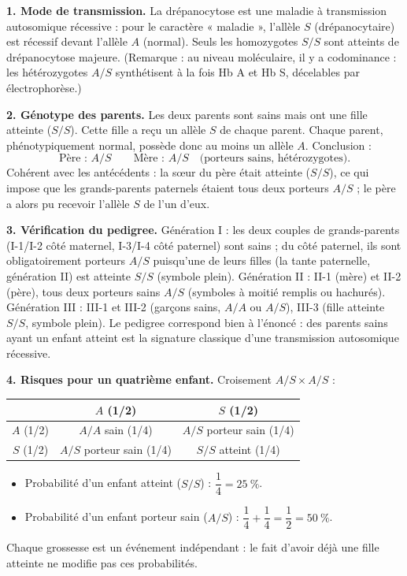 \documentclass[11pt]{article}
\newcommand{\cle}[1]{{\popxbold\color{popdark}#1}}
\begin{document}
\begin{corrige}
\textbf{1. Mode de transmission.} La drépanocytose est une maladie à transmission \cle{autosomique récessive} : pour le caractère « maladie », l'allèle $S$ (drépanocytaire) est récessif devant l'allèle $A$ (normal). Seuls les homozygotes $S/S$ sont atteints de drépanocytose majeure. (Remarque : au niveau moléculaire, il y a codominance : les hétérozygotes $A/S$ synthétisent à la fois Hb A et Hb S, décelables par électrophorèse.)

\textbf{2. Génotype des parents.} Les deux parents sont sains mais ont une fille atteinte ($S/S$). Cette fille a reçu un allèle $S$ de chaque parent. Chaque parent, phénotypiquement normal, possède donc au moins un allèle $A$. Conclusion :
\[ \text{Père : } A/S \qquad \text{Mère : } A/S \quad \text{(porteurs sains, hétérozygotes)}. \]
Cohérent avec les antécédents : la sœur du père était atteinte ($S/S$), ce qui impose que les grands-parents paternels étaient tous deux porteurs $A/S$ ; le père a alors pu recevoir l'allèle $S$ de l'un d'eux.

\textbf{3. Vérification du pedigree.} Génération I : les deux couples de grands-parents (I-1/I-2 côté maternel, I-3/I-4 côté paternel) sont sains ; du côté paternel, ils sont obligatoirement porteurs $A/S$ puisqu'une de leurs filles (la tante paternelle, génération II) est atteinte $S/S$ (symbole plein). Génération II : II-1 (mère) et II-2 (père), tous deux porteurs sains $A/S$ (symboles à moitié remplis ou hachurés). Génération III : III-1 et III-2 (garçons sains, $A/A$ ou $A/S$), III-3 (fille atteinte $S/S$, symbole plein). Le pedigree correspond bien à l'énoncé : des parents sains ayant un enfant atteint est la signature classique d'une transmission autosomique récessive.

\textbf{4. Risques pour un quatrième enfant.} Croisement $A/S \times A/S$ :

\begin{center}
\begin{tabular}{|c|c|c|}\hline
\rowcolor{popblueL} & $A$ (1/2) & $S$ (1/2) \\ \hline
$A$ (1/2) & $A/A$ sain (1/4) & $A/S$ porteur sain (1/4) \\ \hline
$S$ (1/2) & $A/S$ porteur sain (1/4) & $S/S$ atteint (1/4) \\ \hline
\end{tabular}
\end{center}

\begin{itemize}
    \item Probabilité d'un enfant atteint ($S/S$) : $\dfrac{1}{4} = \SI{25}{\percent}$.
    \item Probabilité d'un enfant porteur sain ($A/S$) : $\dfrac{1}{4} + \dfrac{1}{4} = \dfrac{1}{2} = \SI{50}{\percent}$.
\end{itemize}
Chaque grossesse est un événement indépendant : le fait d'avoir déjà une fille atteinte ne modifie pas ces probabilités.


\end{corrige}
\end{document}
